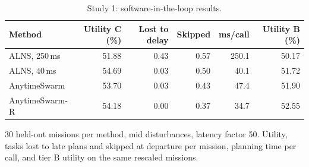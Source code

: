 \begin{table}[t]
\caption{Study 1: software-in-the-loop results.}\label{tab:tierc}
\centering\small
\begin{threeparttable}
\begin{tabular}{lrrrrr}
\toprule
Method & Utility C (\%) & Lost to delay & Skipped & ms/call & Utility B (\%) \\
\midrule
ALNS, 250\,ms & 51.88 & 0.43 & 0.57 & 250.1 & 50.17 \\
ALNS, 40\,ms & 54.69 & 0.03 & 0.50 & 40.1 & 51.72 \\
AnytimeSwarm & 53.70 & 0.03 & 0.43 & 47.4 & 51.90 \\
AnytimeSwarm-R & 54.18 & 0.00 & 0.37 & 34.7 & 52.55 \\
\bottomrule
\end{tabular}
\begin{tablenotes}[flushleft]\scriptsize
\item[] 30 held-out missions per method, mid disturbances, latency factor 50. Utility, tasks lost to late plans and skipped at departure per mission, planning time per call, and tier B utility on the same rescaled missions.
\end{tablenotes}
\end{threeparttable}
\end{table}

